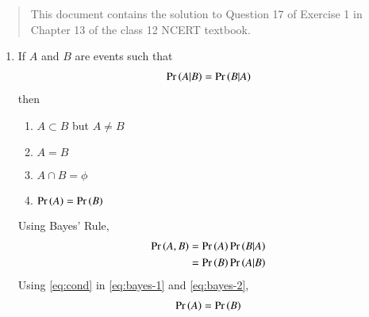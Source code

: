 \documentclass[journal,12pt,twocolumn]{IEEEtran}
\begin{document}
\begin{abstract}
    This document contains the solution to Question 17 of 
    Exercise 1 in Chapter 13 of the class 12 NCERT textbook.
\end{abstract}

\begin{enumerate}
    \item If $A$ and $B$ are events such that 
    \begin{align}
        \Pr\left(A|B\right) = \Pr\left(B|A\right)
        \label{eq:cond}
    \end{align} 
    then 
    \begin{enumerate}
        \item $A \subset B$ but $A \neq B$
        \item $A = B$ 
        \item $A \cap B = \phi$ 
        \item $\Pr\left(A\right) = \Pr\left(B\right)$
    \end{enumerate}

    \solution Using Bayes' Rule,
    \begin{align}
        \Pr\left(A,B\right) &= \Pr\left(A\right)\Pr\left(B|A\right) \label{eq:bayes-1} \\
                      &= \Pr\left(B\right)\Pr\left(A|B\right) \label{eq:bayes-2}
    \end{align}
    Using \eqref{eq:cond} in \eqref{eq:bayes-1} and \eqref{eq:bayes-2},
    \begin{align}
        \Pr\left(A\right) = \Pr\left(B\right)
        \label{eq:a-b}
    \end{align}
    

\end{enumerate}
\end{document}
